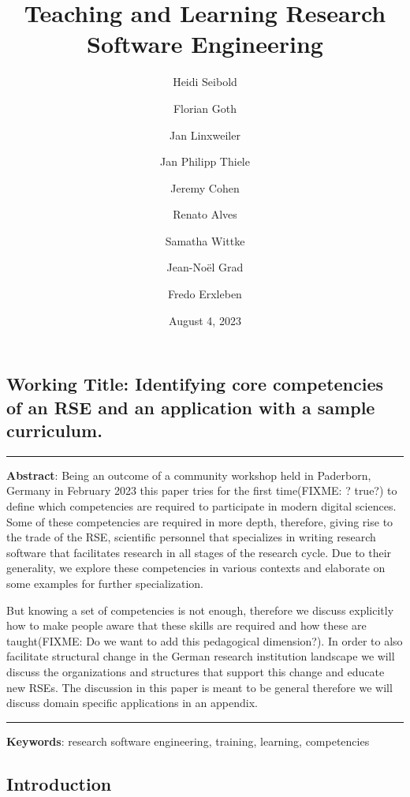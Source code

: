 \documentclass[a4paper
]{article}
\title{Teaching and Learning Research Software Engineering}
\author{Heidi Seibold \and Florian Goth \and Jan Linxweiler \and Jan
Philipp Thiele \and Jeremy Cohen \and Renato Alves \and Samatha
Wittke \and Jean-Noël Grad \and Fredo Erxleben}
\date{August 4, 2023}
\begin{document}
\maketitle

{
\setcounter{tocdepth}{3}
\tableofcontents
}
\hypertarget{working-title-identifying-core-competencies-of-an-rse-and-an-application-with-a-sample-curriculum.}{%
\subsection{Working Title: Identifying core competencies of an RSE and
an application with a sample
curriculum.}\label{working-title-identifying-core-competencies-of-an-rse-and-an-application-with-a-sample-curriculum.}}

\begin{center}\rule{0.5\linewidth}{0.5pt}\end{center}

\textbf{Abstract}: Being an outcome of a community workshop held in
Paderborn, Germany in February 2023 this paper tries for the first
time(FIXME: ? true?) to define which competencies are required to
participate in modern digital sciences. Some of these competencies are
required in more depth, therefore, giving rise to the trade of the RSE,
scientific personnel that specializes in writing research software that
facilitates research in all stages of the research cycle. Due to their
generality, we explore these competencies in various contexts and
elaborate on some examples for further specialization.

But knowing a set of competencies is not enough, therefore we discuss
explicitly how to make people aware that these skills are required and
how these are taught(FIXME: Do we want to add this pedagogical
dimension?). In order to also facilitate structural change in the German
research institution landscape we will discuss the organizations and
structures that support this change and educate new RSEs. The discussion
in this paper is meant to be general therefore we will discuss domain
specific applications in an appendix.

\begin{center}\rule{0.5\linewidth}{0.5pt}\end{center}

\textbf{Keywords}: research software engineering, training, learning,
competencies

\hypertarget{introduction}{%
\subsection{Introduction}\label{introduction}}
\end{document}
